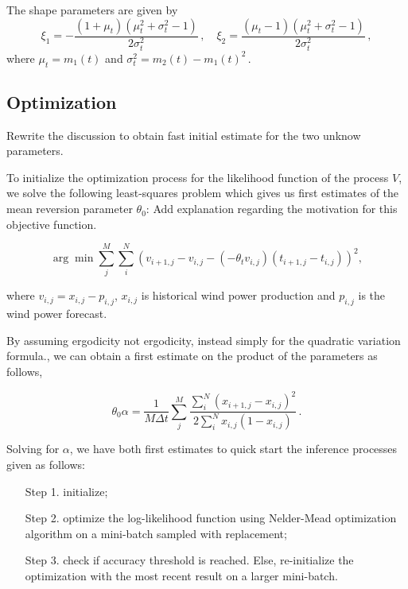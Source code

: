 \documentclass[11pt]{article}
\begin{document}
The shape parameters are given by
\begin{equation}
\xi_1 = - \frac{(1+\mu_t )(\mu_t^2 + \sigma_t^2 -1)}{2 \sigma_t^2}\,, \quad \xi_2=  \frac{(\mu_t-1 )(\mu_t^2 + \sigma_t^2 -1)}{2 \sigma_t^2} \,, \label{param_transformed_beta}
\end{equation}
where $\mu_t = m_1 (t)$ and $\sigma_t^2= m_2 (t)- m_1 (t)^2\,.$

\subsection{Optimization}
{\color{red} Rewrite the discussion to obtain fast initial estimate for the two unknow parameters.}

To initialize the optimization process for the likelihood function of the process $V$, we solve the following least-squares problem which gives us first estimates of the mean reversion parameter $\theta_0$: {\color{red} Add explanation regarding the motivation for this objective function.}

\begin{equation}
 \arg\min \sum\limits_{j}^M \sum\limits_i^N \left( v_{i+1,j}  - v_{i,j}- \left( - \theta_t v_{i,j}\right) \left(t_{i+1,j} - t_{i,j} \right)  \right)^2 ,
 \end{equation}
 
 where $v_{i,j}=x_{i,j}-p_{i,j}$,  $x_{i,j}$ is historical wind power production and $p_{i,j}$ is the wind power forecast.
 
 By assuming ergodicity {\color{red} not ergodicity, instead simply for the quadratic variation formula.}, we can obtain a first estimate on the product of the parameters as follows,
 
\begin{equation}
\theta_0 \alpha = \frac{1}{M\Delta t} \sum\limits_j^M \frac{ \sum\limits_i^N (x_{i+1,j}  - x_{i,j})^2}{2 \sum\limits_i^N x_{i,j}(1-x_{i,j}) } \,.
\end{equation}

Solving for $\alpha$, we have both first estimates to quick start the inference processes given as follows:
\begin{enumerate}
\item[Step 1.]  initialize;
\item[Step 2.]  optimize the log-likelihood function using  Nelder-Mead optimization algorithm on a mini-batch sampled with replacement;
\item[Step 3.] check if  accuracy threshold is reached. Else, re-initialize the optimization with the most recent result on a larger mini-batch.
\end{enumerate}
\end{document}

